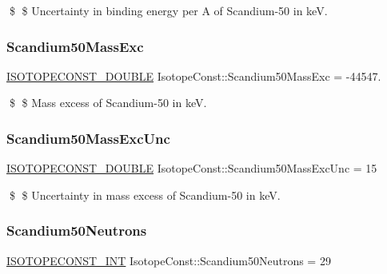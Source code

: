 \$ \$ Uncertainty in binding energy per A of Scandium-\/50 in keV. \mbox{\label{group___isotope_const-_scandium-_sc50_gae8b0638e87c8f7e2a45e95d4fb902367}} 
\subsubsection{\texorpdfstring{Scandium50\+Mass\+Exc}{Scandium50MassExc}}
{\footnotesize\ttfamily \mbox{\hyperlink{group___isotope_const-_macros_ga8f45a7272ce02c0b4c65c44636ed719a}{I\+S\+O\+T\+O\+P\+E\+C\+O\+N\+S\+T\+\_\+\+D\+O\+U\+B\+LE}} Isotope\+Const\+::\+Scandium50\+Mass\+Exc = -\/44547.}

\$ \$ Mass excess of Scandium-\/50 in keV. \mbox{\label{group___isotope_const-_scandium-_sc50_ga7d03341b2f1467a0d2b316025ecad893}} 
\subsubsection{\texorpdfstring{Scandium50\+Mass\+Exc\+Unc}{Scandium50MassExcUnc}}
{\footnotesize\ttfamily \mbox{\hyperlink{group___isotope_const-_macros_ga8f45a7272ce02c0b4c65c44636ed719a}{I\+S\+O\+T\+O\+P\+E\+C\+O\+N\+S\+T\+\_\+\+D\+O\+U\+B\+LE}} Isotope\+Const\+::\+Scandium50\+Mass\+Exc\+Unc = 15}

\$ \$ Uncertainty in mass excess of Scandium-\/50 in keV. \mbox{\label{group___isotope_const-_scandium-_sc50_gabd4df663cae2effac3af1331ddca2a24}} 
\subsubsection{\texorpdfstring{Scandium50\+Neutrons}{Scandium50Neutrons}}
{\footnotesize\ttfamily \mbox{\hyperlink{group___isotope_const-_macros_ga5f18360b3e99483a35c32d789e62621c}{I\+S\+O\+T\+O\+P\+E\+C\+O\+N\+S\+T\+\_\+\+I\+NT}} Isotope\+Const\+::\+Scandium50\+Neutrons = 29}


